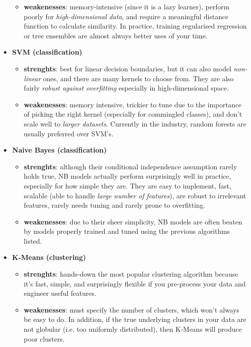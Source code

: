 \documentclass[11pt]{article}
\begin{document}
\begin{itemize}
\begin{itemize}
		\item \textbf{weakenesses}:  memory-intensive (since it is a lazy learner), perform poorly for \textit{high-dimensional data}, and require a meaningful distance function to calculate similarity. In practice, training regularised regression or tree ensembles are almost always better uses of your time.
	\end{itemize}
	\item \textbf{SVM (classification)}
	\begin{itemize}
		\item \textbf{strenghts}: best for linear decision boundaries, but it can also model \textit{non-linear} ones, and there are many kernels to choose from. They are also fairly\textit{ robust against overfitting} especially in high-dimensional space.
		\item \textbf{weakenesses}:  memory intensive, trickier to tune due to the importance of picking the right kernel (especially for commingled classes), and don't scale well to \textit{larger datasets}. Currently in the industry, random forests are usually preferred over SVM's.
	\end{itemize}
	\item \textbf{Naive Bayes (classification)}
	\begin{itemize}
		\item \textbf{strenghts}: although their conditional independence assumption rarely holds true, NB models actually perform surprisingly well in practice, especially for how simple they are. They are easy to implement, fast, scalable  (able to handle \textit{large number of features}), are robust to irrelevant features, rarely needs tuning and rarely prone to overfitting.
		\item \textbf{weakenesses}:  due to their sheer simplicity, NB models are often beaten by models properly trained and tuned using the previous algorithms listed.
	\end{itemize}
	\item \textbf{K-Means (clustering)}
	\begin{itemize}
		\item \textbf{strenghts}: hands-down the most popular clustering algorithm because it's fast, simple, and surprisingly flexible if you pre-process your data and engineer useful features.
		\item \textbf{weakenesses}:  must specify the number of clusters, which won't always be easy to do. In addition, if the true underlying clusters in your data are not globular (i.e. too uniformly distributed), then K-Means will produce poor clusters.

\end{itemize}
\end{itemize}
\end{document}
